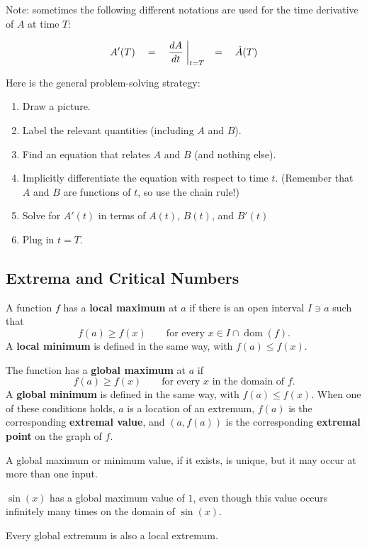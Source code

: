 Note: sometimes the following different notations are used for the time derivative of $A$ at time $T$:

$$A'(T)\quad =\quad \frac{dA}{dt}\biggm\lvert_{t=T}\quad=\quad\dot{A}(T)$$

Here is the general problem-solving strategy:

\begin{strat}
\begin{enumerate}[leftmargin=1em]
\item Draw a picture.
\item Label the relevant quantities (including $A$ and $B$).
\item Find an equation that relates $A$ and $B$ (and nothing else).
\item Implicitly differentiate the equation with respect to time $t$. (Remember that $A$ and $B$ are functions of $t$, so use the chain rule!)
\item Solve for $A'(t)$ in terms of $A(t)$, $B(t)$, and $B'(t)$
\item Plug in $t=T$.
\end{enumerate}
\end{strat}



\subsection{Extrema and Critical Numbers}

\noindent A function $f$ has a \textbf{local maximum} at $a$ if there is an open interval $I\ni a$ such that
$$f(a)\geq f(x)\qquad\text{for every }x\in I\cap\operatorname{dom}(f).$$
A \textbf{local minimum} is defined in the same way, with $f(a)\leq f(x)$.

The function has a \textbf{global maximum} at $a$ if
$$f(a)\geq f(x)\qquad\text{for every }x\text{ in the domain of }f.$$
A \textbf{global minimum} is defined in the same way, with $f(a)\leq f(x)$.
When one of these conditions holds, $a$ is a location of an extremum, $f(a)$ is the corresponding \textbf{extremal value}, and $(a,f(a))$ is the corresponding \textbf{extremal point} on the graph of $f$.

A global maximum or minimum value, if it exists, is unique, but it may occur at more than one input.
\begin{exampleblock}
$\sin(x)$ has a global maximum value of $1$, even though this value occurs infinitely many times on the domain of $\sin(x)$.
\end{exampleblock}
Every global extremum is also a local extremum.

